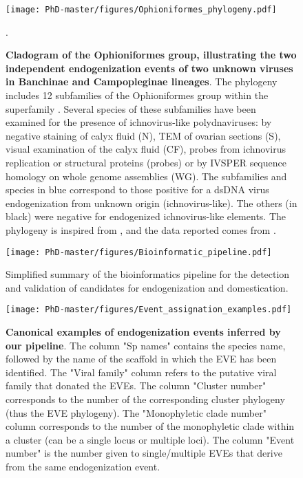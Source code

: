 \begin{figure}[!ht]
 \centering
  \texttt{[image: PhD-master/figures/Ophioniformes\_phylogeny.pdf]}
\caption[Paper1:Recapitulation of Ichnovirus within Ophioniformes wasps]{\textbf{Cladogram of the Ophioniformes group, illustrating the two independent endogenization events of two unknown viruses in Banchinae and Campopleginae lineages}. The phylogeny includes 12 subfamilies of the Ophioniformes group within the superfamily . Several species of these subfamilies have been examined for the presence of ichnovirus-like polydnaviruses: by negative staining of calyx fluid (N), TEM of ovarian sections (S), visual examination of the calyx fluid (CF), probes from ichnovirus replication or structural proteins (probes) or by IVSPER sequence homology on whole genome assemblies (WG). The subfamilies and species in blue correspond to those positive for a dsDNA virus endogenization from unknown origin (ichnovirus-like). The others (in black) were negative for endogenized ichnovirus-like elements.
The phylogeny is inspired from \cite{sharanowski_phylogenomics_2021},  and the data reported comes from \cite{sharanowski_phylogenomics_2021,beliveau_genomic_2015,cusson_genomics_2012, legeai_genomic_2020}.}.
\label{figure:Ophioniformes_phylogeny}
\end{figure}

\begin{figure}[!ht]
 \centering
  \texttt{[image: PhD-master/figures/Bioinformatic\_pipeline.pdf]}
\caption[Paper1:Simplified summary of the bioinformatics pipeline for the detection of EVEs and dEVEs]{Simplified summary of the bioinformatics pipeline for the detection and validation of candidates for endogenization
and domestication.}
\label{figure:Bioinformatic_pipeline}
\end{figure}

\begin{figure}[!htpb]
 \centering
  \texttt{[image: PhD-master/figures/Event\_assignation\_examples.pdf]}
\caption[Paper1:Canonical examples of endogenization events]{\textbf{Canonical examples of endogenization events inferred by our pipeline}. 
The column "Sp names" contains the species name, followed by the name of the scaffold in which the EVE has been identified. The "Viral family" column refers to the putative viral family that donated the EVEs. The column "Cluster number" corresponds to the number of the corresponding cluster phylogeny (thus the EVE phylogeny). The "Monophyletic clade number" column corresponds to the number of the monophyletic clade within a cluster (can be a single locus or  multiple loci). The column "Event number" is the number given to single/multiple EVEs that derive from the same endogenization event.}
\label{figure:Event_assignation_examples}
\end{figure}



%

